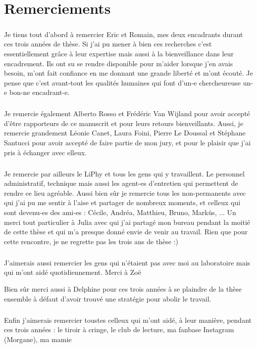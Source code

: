 \thispagestyle{empty}

\section*{Remerciements}

\subparagraph{}Je tiens tout d'abord à remercier Eric et Romain, mes deux encadrants durant ces trois années de thèse. Si j'ai pu mener à bien ces recherches c'est essentiellement grâce à leur expertise mais aussi à la bienveillance dans leur encadrement. Ils ont su se rendre disponible pour m'aider lorsque j'en avais besoin, m'ont fait confiance en me donnant une grande liberté et m'ont écouté. Je pense que c'est avant-tout les qualités humaines qui font d'un-e chercheureuse un-e bon-ne encadrant-e.

\subparagraph{}Je remercie également Alberto Rosso et Frédéric Van Wijland pour avoir accepté d'être rapporteurs de ce manuscrit et pour leurs retours bienveillants. Aussi, je remercie grandement Léonie Canet, Laura Foini, Pierre Le Doussal et Stéphane Santucci pour avoir accepté de faire partie de mon jury, et pour le plaisir que j'ai pris à échanger avec elleux.

\subparagraph{}Je remercie par ailleurs le LiPhy et tous les gens qui y travaillent. Le personnel administratif, technique mais aussi les agent-es d'entretien qui permettent de rendre ce lieu agréable. Aussi bien sûr je remercie tous les non-permanents avec qui j'ai pu me sentir à l'aise et partager de nombreux moments, et celleux qui sont devenu-es des ami-es : Cécile, Andréa, Matthieu, Bruno, Marküs, ... Un merci tout particulier à Julia avec qui j'ai partagé mon bureau pendant la moitié de cette thèse et qui m'a presque donné envie de venir au travail. Rien que pour cette rencontre, je ne regrette pas les trois ans de thèse :)

\subparagraph{}J'aimerais aussi remercier les gens qui n'étaient pas avec moi au laboratoire mais qui m'ont aidé quotidiennement. Merci à Zoë 

Bien sûr merci aussi à Delphine pour ces trois années à se plaindre de la thèse ensemble à défaut d'avoir trouvé une stratégie pour abolir le travail. 

\subparagraph{}Enfin j'aimerais remercier toustes celleux qui m'ont aidé, à leur manière, pendant ces trois années : le tiroir à cringe, le club de lecture, ma fanbase Instagram (Morgane), ma mamie 

\thispagestyle{empty}